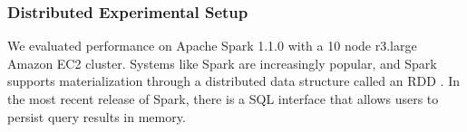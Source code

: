 \subsubsection{Distributed Experimental Setup}
We evaluated performance on Apache Spark 1.1.0 with a 10 node r3.large Amazon EC2 cluster.
Systems like Spark are increasingly popular, and Spark supports materialization through a distributed data structure called an RDD \cite{zaharia2012resilient}.
In the most recent release of Spark, there is a SQL interface that allows users to persist query results in memory.

